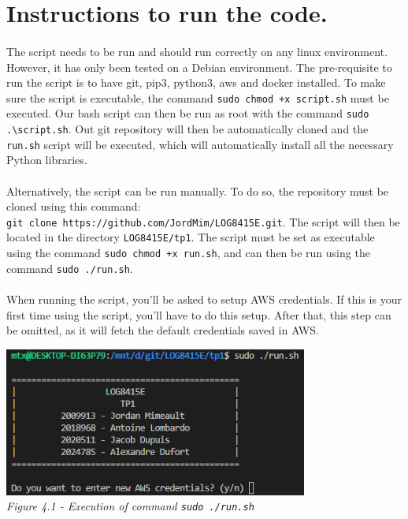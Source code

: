 \pagebreak
\section{Instructions to run the code.} \label{T4}

\paragraph{}The script needs to be run and should run correctly on any linux environment. However, it has only been tested on a Debian environment. The pre-requisite to run the script is to have git, pip3, python3, aws and docker installed. To make sure the script is executable, the command \verb|sudo chmod +x script.sh| must be executed. Our bash script can then be run as root with the command \verb|sudo .\script.sh|. Out git repository will then be automatically cloned and the \verb|run.sh| script will be executed, which will automatically install all the necessary Python libraries.

\paragraph{}Alternatively, the script can be run manually. To do so, the repository must be cloned using this command:\\\verb|git clone https://github.com/JordMim/LOG8415E.git|. The script will then be located in the directory \verb|LOG8415E/tp1|. The script must be set as executable using the command \verb|sudo chmod +x run.sh|, and can then be run using the command \verb|sudo ./run.sh|.

\paragraph{}When running the script, you'll be asked to setup AWS credentials. If this is your first time using the script, you'll have to do this setup. After that, this step can be omitted, as it will fetch the default credentials saved in AWS.\\

\begin{center}
\includegraphics[width=10cm]{Resources/aws_credentials.png}\\
\emph{Figure 4.1 - Execution of command \verb|sudo ./run.sh|}
\end{center}\\

